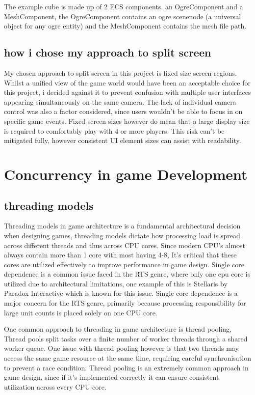\documentclass[]{final_report}
\begin{document}
The example cube is made up of 2 ECS components. an OgreComponent and a MeshComponent, the OgreComponent contains an ogre scenenode (a universal object for any ogre entity) and the MeshComponent contains the mesh file path.
\subsection{how i chose my approach to split screen}
My chosen approach to split screen in this project is fixed size screen regions. Whilst a unified view of the game world would have been an acceptable choice for this project, i decided against it to prevent confusion with multiple user interfaces appearing simultaneously on the same camera. The lack of individual camera control was also a factor considered, since users wouldn't be able to focus in on specific game events. Fixed screen sizes however do mean that a large display size is required to comfortably play with 4 or more players. This risk can't be mitigated fully, however consistent UI element sizes can assist with readability.

\section{Concurrency in game Development}
\subsection{threading models}
Threading models in game architecture is a fundamental architectural decision when designing games, threading models dictate how processing load is spread across different threads and thus across CPU cores. Since modern CPU's almost always contain more than 1 core with most having 4-8, It's critical that these cores are utilized effectively to improve performance in game design. Single core dependence is a common issue faced in the RTS genre, where only one cpu core is utilized due to architectural limitations, one example of this is Stellaris by Paradox Interactive which is known for this issue. Single core dependence is a major concern for the RTS genre, primarily because processing responsibility for large unit counts is placed solely on one CPU core.

One common approach to threading in game architecture is thread pooling, Thread pools split tasks over a finite number of worker threads through a shared worker queue. One issue with thread pooling however is that two threads may access the same game resource at the same time, requiring careful synchronisation to prevent a race condition. Thread pooling is an extremely common approach in game design, since if it's implemented correctly it can ensure consistent utilization across every CPU core.
\end{document}
